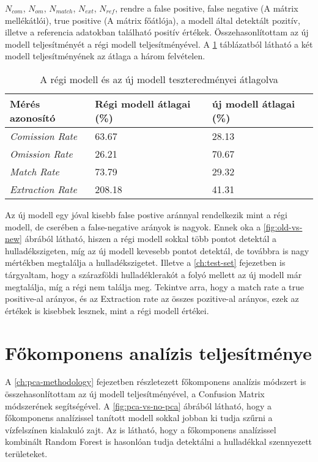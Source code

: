 $N_{com}$, $N_{om}$, $N_{match}$, $N_{ext}$, $N_{ref}$, rendre a false positive, false negative (A mátrix mellékátlói), true positive (A mátrix főátlója), a modell által detektált pozitív, illetve a referencia adatokban található positív értékek. Összehasonlítottam az új modell teljesítményét a régi modell teljesítményével. A \ref{tab:old-vs-new} táblázatból látható a két modell teljesítményének az átlaga a három felvételen.

\begin{table}[H]
	\centering
	\begin{tabular}{ | p{} | p{} | p{} | }
		\hline
		\textbf{Mérés azonosító} & \textbf{Régi modell átlagai (\%)} & \textbf{új modell átlagai (\%)} \\
		\hline \hline
		\emph{Comission Rate} & 63.67 & 28.13 \\
		\hline
		\emph{Omission Rate} & 26.21 & 70.67 \\
		\hline
		\emph{Match Rate} & 73.79 & 29.32 \\
		\hline
        \emph{Extraction Rate} & 208.18 & 41.31 \\
		\hline
	\end{tabular}
	\caption{A régi modell és az új modell teszteredményei átlagolva}
	\label{tab:old-vs-new}
\end{table}

Az új modell egy jóval kisebb false postive aránnyal rendelkezik mint a régi modell, de cserében a false-negative arányok is nagyok. Ennek oka a \ref{fig:old-vs-new} ábrából látható, hiszen a régi modell sokkal több pontot detektál a hulladékszigeten, míg az új modell kevesebb pontot detektál, de továbbra is nagy mértékben megtalálja a hulladékszigetet. Illetve a \ref{ch:test-set} fejezetben is tárgyaltam, hogy a szárazföldi hulladéklerakót a folyó mellett az új modell már megtalálja, míg a régi nem találja meg. Tekintve arra, hogy a match rate a true positive-al arányos, és az Extraction rate az összes pozitive-al arányos, ezek az értékek is kisebbek lesznek, mint a régi modell értékei.

\section{Főkomponens analízis teljesítménye}
\label{ch:pca-performance}

A \ref{ch:pca-methodology} fejezetben részletezett főkomponens analízis módszert is összehasonlítottam az új modell teljesítményével, a Confusion Matrix módszerének segítségével. A \ref{fig:pca-vs-no-pca} ábrából látható, hogy a főkomponens analízissel tanított modell sokkal jobban ki tudja szűrni a vízfelszínen kialakuló zajt. Az is látható, hogy a főkomponens analízissel kombinált Random Forest is hasonlóan tudja detektálni a hulladékkal szennyezett területeket.

